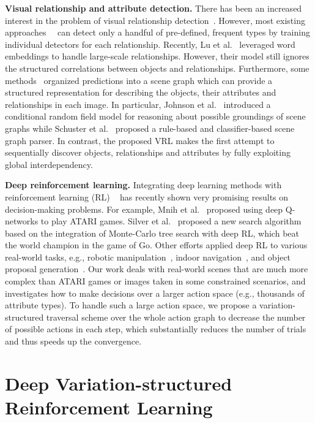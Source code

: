 \documentclass[10pt,twocolumn,letterpaper]{article}
\begin{document}
\textbf{Visual relationship and attribute detection.} {There has been an increased interest in the problem of visual relationship detection}~\cite{sadeghi2011recognition,sadeghi2015viske,krishna2016visual}. However, most existing approaches~\cite{sadeghi2011recognition}~\cite{krishna2016visual} can detect only a handful of pre-defined, frequent types by training individual detectors for each relationship. Recently, Lu et al.~\cite{lu2016visual} leveraged word embeddings to handle large-scale relationships. However, their model still ignores the structured correlations between objects and relationships. Furthermore, some methods~\cite{johnson2015image,schuster2015generating,liao2016support} organized predictions into a scene graph which can provide a structured representation for describing the objects, their attributes and relationships in each image. In particular, Johnson et al.~\cite{johnson2015image} introduced a conditional random field model for reasoning about possible groundings of scene graphs while Schuster et al.~\cite{schuster2015generating} proposed a rule-based and classifier-based scene graph parser. In contrast, the proposed VRL makes the first attempt to sequentially discover objects, relationships and attributes by fully exploiting global interdependency. 

\textbf{Deep reinforcement learning.} Integrating deep learning methods with reinforcement learning {(RL)} ~\cite{kaelbling1996reinforcement} has recently shown very promising results on decision-making problems. For example, Mnih et al.~\cite{mnih2015human} proposed using deep Q-networks to play ATARI games. Silver et al.~\cite{silver2016mastering} proposed a new search algorithm based on the integration of Monte-Carlo tree search with deep RL, which {beat} the world champion in the game of Go. {Other efforts applied deep RL to various real-world tasks,} e.g., robotic manipulation~\cite{gu2016deep}, indoor navigation~\cite{zhu2016target}, and object proposal generation~\cite{caicedo2015active}. Our work deals with real-world scenes that are much more  complex than ATARI games or images taken in some constrained scenarios, and investigates how to make decisions over a larger action space (e.g., thousands of attribute types). To handle such a large action space, we propose a variation-structured traversal scheme over the whole action graph to decrease the number of possible actions in each step, which substantially reduces the number of trials and thus speeds up the convergence.


\section{Deep Variation-structured Reinforcement Learning}
\end{document}
